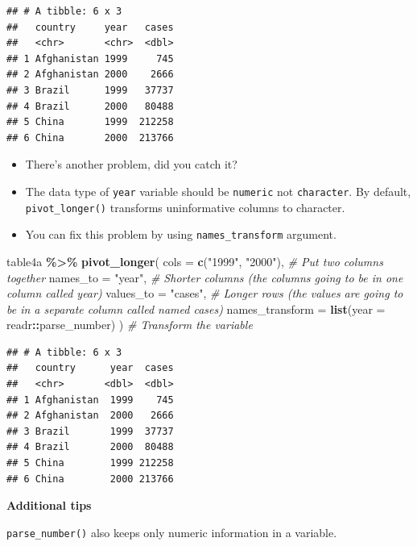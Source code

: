 \documentclass[
]{book}
\newenvironment{Shaded}{\begin{snugshade}}{\end{snugshade}}
\newcommand{\AttributeTok}[1]{\textcolor[rgb]{0.13,0.29,0.53}{#1}}
\newcommand{\CommentTok}[1]{\textcolor[rgb]{0.56,0.35,0.01}{\textit{#1}}}
\newcommand{\FunctionTok}[1]{\textcolor[rgb]{0.13,0.29,0.53}{\textbf{#1}}}
\newcommand{\NormalTok}[1]{#1}
\newcommand{\SpecialCharTok}[1]{\textcolor[rgb]{0.81,0.36,0.00}{\textbf{#1}}}
\newcommand{\StringTok}[1]{\textcolor[rgb]{0.31,0.60,0.02}{#1}}
\begin{document}
\begin{verbatim}
## # A tibble: 6 x 3
##   country     year   cases
##   <chr>       <chr>  <dbl>
## 1 Afghanistan 1999     745
## 2 Afghanistan 2000    2666
## 3 Brazil      1999   37737
## 4 Brazil      2000   80488
## 5 China       1999  212258
## 6 China       2000  213766
\end{verbatim}

\begin{itemize}
\item
  There's another problem, did you catch it?
\item
  The data type of \texttt{year} variable should be \texttt{numeric} not \texttt{character}. By default, \texttt{pivot\_longer()} transforms uninformative columns to character.
\item
  You can fix this problem by using \texttt{names\_transform} argument.
\end{itemize}

\begin{Shaded}
\begin{Highlighting}[]
\NormalTok{table4a }\SpecialCharTok{\%\textgreater{}\%}
  \FunctionTok{pivot\_longer}\NormalTok{(}
    \AttributeTok{cols =} \FunctionTok{c}\NormalTok{(}\StringTok{"1999"}\NormalTok{, }\StringTok{"2000"}\NormalTok{), }\CommentTok{\# Put two columns together}
    \AttributeTok{names\_to =} \StringTok{"year"}\NormalTok{, }\CommentTok{\# Shorter columns (the columns going to be in one column called year)}
    \AttributeTok{values\_to =} \StringTok{"cases"}\NormalTok{, }\CommentTok{\# Longer rows (the values are going to be in a separate column called named cases)}
    \AttributeTok{names\_transform =} \FunctionTok{list}\NormalTok{(}\AttributeTok{year =}\NormalTok{ readr}\SpecialCharTok{::}\NormalTok{parse\_number)}
\NormalTok{  ) }\CommentTok{\# Transform the variable}
\end{Highlighting}
\end{Shaded}

\begin{verbatim}
## # A tibble: 6 x 3
##   country      year  cases
##   <chr>       <dbl>  <dbl>
## 1 Afghanistan  1999    745
## 2 Afghanistan  2000   2666
## 3 Brazil       1999  37737
## 4 Brazil       2000  80488
## 5 China        1999 212258
## 6 China        2000 213766
\end{verbatim}

\textbf{Additional tips}

\texttt{parse\_number()} also keeps only numeric information in a variable.
\end{document}
